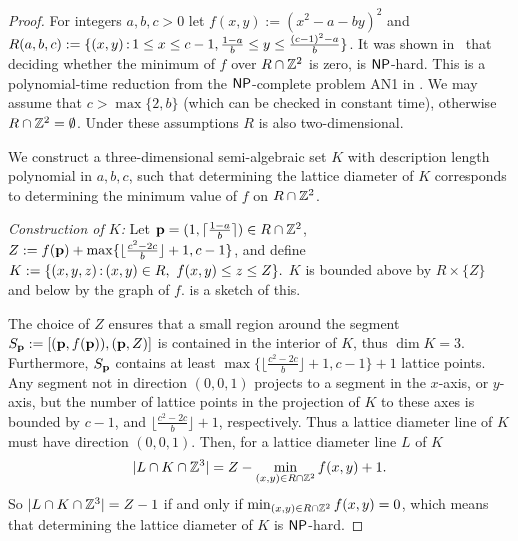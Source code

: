 \begin{proof}
For integers $a,b,c>0$ let $f(x,y):=(x^2-a-by)^2$ and $R(a,b,c):=\{ (x,y) \, \mathrm{:}\, 1 \leq x \leq c-1, \frac{1-a}{b} \leq y \leq \frac{(c-1)^2-a}{b}\}$.
It was shown in~\cite[Lemma 2.1]{Lemma2.1} that deciding whether the minimum of $f$ over $R \cap \mathbb{Z}^2$ is zero, is $\operatorname{\mathsf{NP}}$-hard. This is a polynomial-time reduction from the $\operatorname{\mathsf{NP}}$-complete problem AN1 in \cite[p.~249]{GJ}. We may assume that $c>\max\{2,b\}$ (which can be checked in constant time), otherwise $R \cap \mathbb{Z}^2 = \emptyset$. Under these assumptions $R$ is also two-dimensional.



We construct a three-dimensional semi-algebraic set $K$ with description length polynomial in $a,b,c$, such that determining the lattice diameter of $K$ corresponds to determining the minimum value of $f$ on $R \cap\mathbb{Z}^2$.

\textit{Construction of $K$:} Let $\mathbf{p}=(1,\lceil \frac{1-a}{b} \rceil ) \in R \cap \mathbb{Z}^2$, $Z:=f(\mathbf{p}) + \max\{  \lfloor \frac{c^2-2c}{b}\rfloor +1,c-1\}$, and define $ K:= \{ (x,y,z) \, \mathrm{:}\, (x,y) \in R, \ f(x,y) \leq z \leq Z \}.$ $K$ is bounded above by $R \times \{Z\}$ and below by the graph of $f$.  is a sketch of this. 

    
     
The choice of $Z$ ensures that a small region around the segment $S_{\mathbf{p}}:=[(\mathbf{p},f(\mathbf{p})),(\mathbf{p},Z)]$ is contained in the interior of $K$, thus $\dim K =3$.
Furthermore, $S_{\mathbf{p}}$ contains at least $\max\{ \lfloor\frac{c^2-2c}{b}\rfloor +1,c-1\} +1$ lattice points. Any segment not in direction $(0,0,1)$ projects to a segment in the $x$-axis, or $y$-axis, but the number of lattice points in the projection of $K$ to these axes is bounded by $c-1$, and $\lfloor \frac{c^2-2c}{b}\rfloor +1$, respectively. Thus a lattice diameter line of $K$ must have direction $(0,0,1)$. Then, for a lattice diameter line $L$ of $K$
\begin{align*}
         |L \cap K \cap \mathbb{Z}^3| = Z-\min_{(x,y) \in R \cap \mathbb{Z}^2}f(x,y) +1.
     \end{align*}
So $|L \cap K \cap \mathbb{Z}^3|=Z-1$ if and only if $\min_{(x,y)\in R \cap \mathbb{Z}^2} f(x,y)=0$, which means that determining the lattice diameter of $K$ is $\operatorname{\mathsf{NP}}$-hard.


\end{proof}
